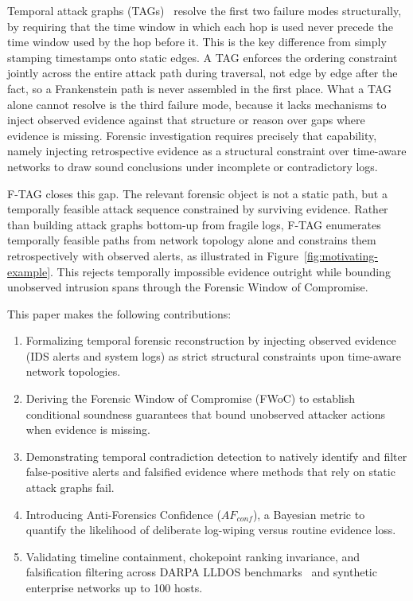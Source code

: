 \documentclass[12pt]{article}
\begin{document}
Temporal attack graphs (TAGs)~\cite{Gain2023} resolve the first two failure modes structurally, by requiring that the time window in which each hop is used never precede the time window used by the hop before it. This is the key difference from simply stamping timestamps onto static edges. A TAG enforces the ordering constraint jointly across the entire attack path during traversal, not edge by edge after the fact, so a Frankenstein path is never assembled in the first place. What a TAG alone cannot resolve is the third failure mode, because it lacks mechanisms to inject observed evidence against that structure or reason over gaps where evidence is missing. Forensic investigation requires precisely that capability, namely injecting retrospective evidence as a structural constraint over time-aware networks to draw sound conclusions under incomplete or contradictory logs.

F-TAG closes this gap. The relevant forensic object is not a static path, but a temporally feasible attack sequence constrained by surviving evidence. Rather than building attack graphs bottom-up from fragile logs, F-TAG enumerates temporally feasible paths from network topology alone and constrains them retrospectively with observed alerts, as illustrated in Figure~\ref{fig:motivating-example}. This rejects temporally impossible evidence outright while bounding unobserved intrusion spans through the Forensic Window of Compromise.

This paper makes the following contributions:
\begin{enumerate}
    \item Formalizing temporal forensic reconstruction by injecting observed evidence (IDS alerts and system logs) as strict structural constraints upon time-aware network topologies.
    \item Deriving the Forensic Window of Compromise (FWoC) to establish conditional soundness guarantees that bound unobserved attacker actions when evidence is missing.
    \item Demonstrating temporal contradiction detection to natively identify and filter false-positive alerts and falsified evidence where methods that rely on static attack graphs fail.
    \item Introducing Anti-Forensics Confidence ($AF_{conf}$), a Bayesian metric to quantify the likelihood of deliberate log-wiping versus routine evidence loss.
    \item Validating timeline containment, chokepoint ranking invariance, and falsification filtering across DARPA LLDOS benchmarks~\cite{haines2001extending,darpa2000lldos} and synthetic enterprise networks up to 100 hosts.
\end{enumerate}
\end{document}
